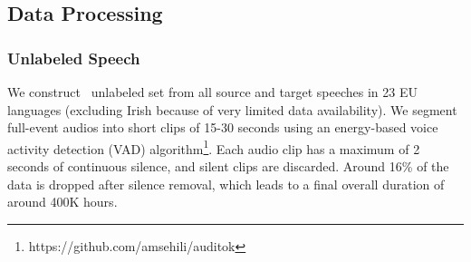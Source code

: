 \subsection{Data Processing}
\label{sec:data_processing}
\subsubsection{Unlabeled Speech}
We construct \vp~unlabeled set from all source and target speeches in 23 EU languages (excluding Irish because of very limited data availability). We segment full-event audios into short clips of 15-30 seconds using an energy-based voice activity detection (VAD) algorithm\footnote{https://github.com/amsehili/auditok}. Each audio clip has a maximum of 2 seconds of continuous silence, and silent clips are discarded. Around 16\% of the data is dropped after silence removal, which leads to a final overall duration of around 400K hours.

